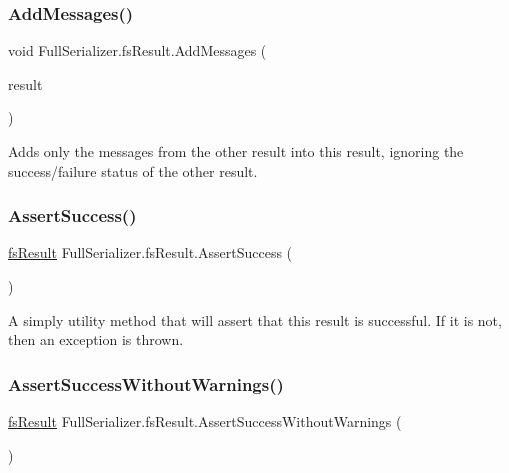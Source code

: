 \subsubsection{\texorpdfstring{Add\+Messages()}{AddMessages()}}
{\footnotesize\ttfamily void Full\+Serializer.\+fs\+Result.\+Add\+Messages (\begin{DoxyParamCaption}\item[{\hyperlink{struct_full_serializer_1_1fs_result}{fs\+Result}}]{result }\end{DoxyParamCaption})\hspace{0.3cm}{\ttfamily [inline]}}



Adds only the messages from the other result into this result, ignoring the success/failure status of the other result. 

\mbox{\label{struct_full_serializer_1_1fs_result_a2f5ddbcfe4d51a087e1870df76cc2235}} 
\subsubsection{\texorpdfstring{Assert\+Success()}{AssertSuccess()}}
{\footnotesize\ttfamily \hyperlink{struct_full_serializer_1_1fs_result}{fs\+Result} Full\+Serializer.\+fs\+Result.\+Assert\+Success (\begin{DoxyParamCaption}{ }\end{DoxyParamCaption})\hspace{0.3cm}{\ttfamily [inline]}}



A simply utility method that will assert that this result is successful. If it is not, then an exception is thrown. 

\mbox{\label{struct_full_serializer_1_1fs_result_a0779492de62a8b952b37617c2e7ff362}} 
\subsubsection{\texorpdfstring{Assert\+Success\+Without\+Warnings()}{AssertSuccessWithoutWarnings()}}
{\footnotesize\ttfamily \hyperlink{struct_full_serializer_1_1fs_result}{fs\+Result} Full\+Serializer.\+fs\+Result.\+Assert\+Success\+Without\+Warnings (\begin{DoxyParamCaption}{ }\end{DoxyParamCaption})\hspace{0.3cm}{\ttfamily [inline]}}



